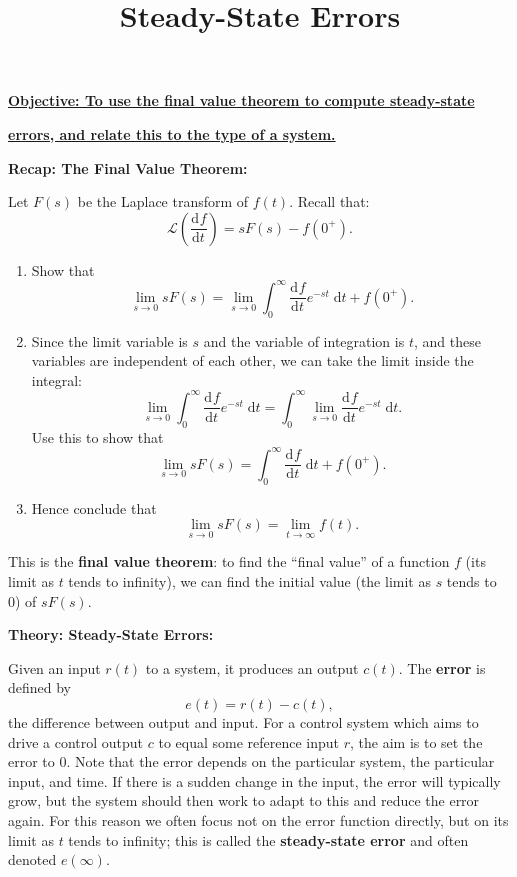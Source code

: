 \documentclass{article}
\newcommand{\deriv}[3][]{\frac{\mathrm{d}^{#1}#2}{\mathrm{d}#3^{#1}}}
\newcommand{\diff}{\;\mathrm{d}}
\begin{document}
\title{Steady-State Errors}
\date{}

\maketitle
\thispagestyle{empty}

\Large

\vskip -10mm

\textbf{\underline{Objective: To use the final value theorem to compute steady-state}}

\textbf{\underline{errors, and relate this to the type of a system.}}








\vspace{5mm}






\textbf{Recap: The Final Value Theorem:}\bigskip

Let $F(s)$ be the Laplace transform of $f(t)$. Recall that:
\[\mathcal{L}\left(\deriv{f}{t}\right)=sF(s)-f(0^+).\]


\begin{enumerate}
	\item Show that
		\[\lim_{s\to 0} sF(s) = \lim_{s\to 0} \int_0^\infty \deriv{f}{t}e^{-st}\diff t + f(0^+).\]
	\item Since the limit variable is $s$ and the variable of integration is $t$, and these variables are independent of each other, we can take the limit inside the integral:
		\[\lim_{s\to 0} \int_0^\infty \deriv{f}{t}e^{-st}\diff t = \int_0^\infty \lim_{s\to 0} \deriv{f}{t}e^{-st}\diff t.\]
		Use this to show that
		\[\lim_{s\to 0} sF(s) = \int_0^\infty \deriv{f}{t}\diff t + f(0^+).\]
	\item Hence conclude that
		\[\lim_{s\to 0} sF(s) = \lim_{t\to \infty}f(t).\]
\end{enumerate}




This is the \textbf{final value theorem}: to find the ``final value'' of a function $f$ (its limit as $t$ tends to infinity), we can find the initial value (the limit as $s$ tends to 0) of $sF(s)$.


\clearpage






\textbf{Theory: Steady-State Errors:}\bigskip

Given an input $r(t)$ to a system, it produces an output $c(t)$. The \textbf{error} is defined by
\[e(t)=r(t)-c(t),\]
the difference between output and input. For a control system which aims to drive a control output $c$ to equal some reference input $r$, the aim is to set the error to 0. Note that the error depends on the particular system, the particular input, and time. If there is a sudden change in the input, the error will typically grow, but the system should then work to adapt to this and reduce the error again. For this reason we often focus not on the error function directly, but on its limit as $t$ tends to infinity; this is called the \textbf{steady-state error} and often denoted $e(\infty)$.
\end{document}
